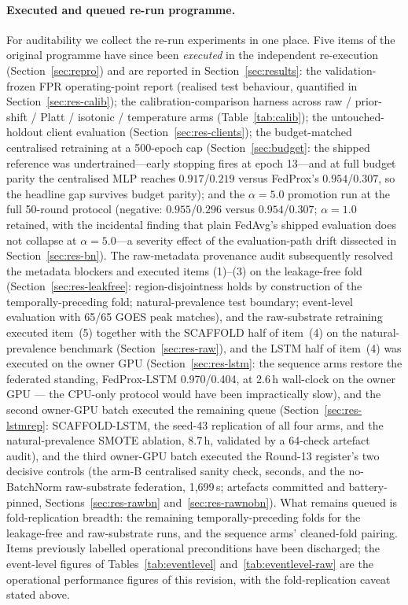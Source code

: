 \paragraph{Executed and queued re-run programme.}
For auditability we collect the re-run experiments in one place.
Five items of the original programme have since been \emph{executed}
in the independent re-execution (Section~\ref{sec:repro}) and are
reported in Section~\ref{sec:results}: the validation-frozen FPR
operating-point report (realised test behaviour, quantified in
Section~\ref{sec:res-calib}); the calibration-comparison harness
across raw / prior-shift / Platt / isotonic / temperature arms
(Table~\ref{tab:calib}); the untouched-holdout client evaluation
(Section~\ref{sec:res-clients}); the budget-matched centralised
retraining at a 500-epoch cap (Section~\ref{sec:budget}: the shipped
reference was undertrained---early stopping fires at epoch 13---and
at full budget parity the centralised MLP reaches $0.917$/$0.219$
versus FedProx's $0.954$/$0.307$, so the headline gap survives
budget parity); and the $\alpha{=}5.0$ promotion run at the full
50-round protocol (negative: $0.955$/$0.296$ versus $0.954$/$0.307$;
$\alpha{=}1.0$ retained, with the incidental finding that plain
FedAvg's shipped evaluation does not collapse at $\alpha{=}5.0$---a
severity effect of the evaluation-path drift dissected in
Section~\ref{sec:res-bn}). The
raw-metadata provenance audit subsequently resolved the metadata
blockers and executed items (1)--(3) on the leakage-free fold
(Section~\ref{sec:res-leakfree}: region-disjointness holds by
construction of the temporally-preceding fold; natural-prevalence
test boundary; event-level evaluation with 65/65 GOES peak
matches), and the raw-substrate retraining executed item~(5)
together with the SCAFFOLD half of item~(4) on the natural-prevalence
benchmark (Section~\ref{sec:res-raw}), and the LSTM half of
item~(4) was executed on the owner GPU (Section~\ref{sec:res-lstm}:
the sequence arms restore the federated standing, FedProx-LSTM
0.970/0.404, at 2.6\,h wall-clock on the owner GPU — the CPU-only protocol would have been impractically slow),
and the second owner-GPU batch executed the remaining queue
(Section~\ref{sec:res-lstmrep}: SCAFFOLD-LSTM, the seed-43
replication of all four arms, and the natural-prevalence SMOTE
ablation, 8.7\,h, validated by a 64-check artefact audit), and the
third owner-GPU batch executed the Round-13 register's two decisive
controls (the arm-B centralised sanity check, seconds, and the
no-BatchNorm raw-substrate federation, 1{,}699\,s; artefacts
committed and battery-pinned, Sections~\ref{sec:res-rawbn}
and~\ref{sec:res-rawnobn}).
What remains queued is fold-replication breadth: the remaining
temporally-preceding folds for the leakage-free and raw-substrate
runs, and the sequence arms' cleaned-fold pairing.
Items previously labelled operational preconditions have
been discharged; the event-level figures of
Tables~\ref{tab:eventlevel} and~\ref{tab:eventlevel-raw} are the
operational performance figures of this revision, with the
fold-replication caveat stated above.
